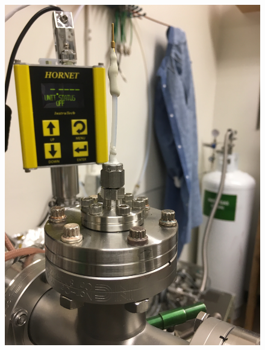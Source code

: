 \begin{figure}[htbp]
\begin{minipage}{0.33\textwidth}
    \includegraphics[width=\linewidth]{figures/testbed/ft6_4.jpg}
    \end{minipage}
    \hspace{\fill} %
    \begin{minipage}{0.33\textwidth}

\end{minipage}
\end{figure}
